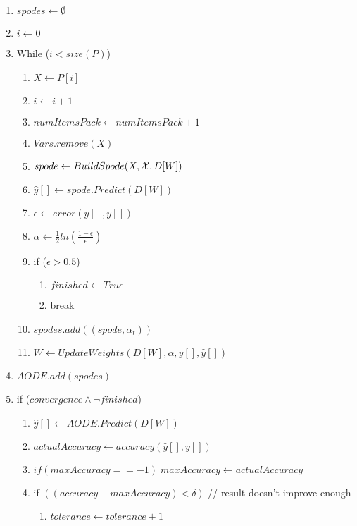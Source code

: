 \begin{enumerate}
\begin{enumerate}
    \item $spodes \leftarrow \emptyset$
    \item $i \leftarrow 0$
    \item While ($ i < size(P)$)
    \begin{enumerate}
        \item $X \leftarrow P[i]$
        \item $i \leftarrow i + 1$
        \item $numItemsPack \leftarrow numItemsPack + 1$
        \item $Vars.remove(X)$
        \item $spode \leftarrow BuildSpode(X, {\cal{X}}, D[W])$
        \item $\hat{y}[] \leftarrow spode.Predict(D[W])$
        \item $\epsilon \leftarrow error(\hat{y}[], y[])$
        \item $\alpha \leftarrow \frac{1}{2} ln \left ( \frac{1-\epsilon}{\epsilon} \right )$
        \item if ($\epsilon > 0.5$)
        \begin{enumerate}
            \item $finished \leftarrow True$
            \item break
        \end{enumerate}
        \item $spodes.add( (spode,\alpha_t) )$
        \item $W \leftarrow UpdateWeights(D[W],\alpha,y[],\hat{y}[])$
    \end{enumerate}       
    \item $AODE.add( spodes )$
    \item if ($convergence \land \lnot finished$) 
    \begin{enumerate}       
        \item $\hat{y}[] \leftarrow AODE.Predict(D[W])$
        \item $actualAccuracy \leftarrow accuracy(\hat{y}[], y[])$
        \item $if (maxAccuracy == -1)\; maxAccuracy \leftarrow actualAccuracy$
        \item if $((accuracy - maxAccuracy) < \delta)$\hspace*{2cm} // result doesn't improve enough
        \begin{enumerate}
            \item $tolerance \leftarrow tolerance + 1$
        \end{enumerate}

\end{enumerate}
\end{enumerate}
\end{enumerate}
